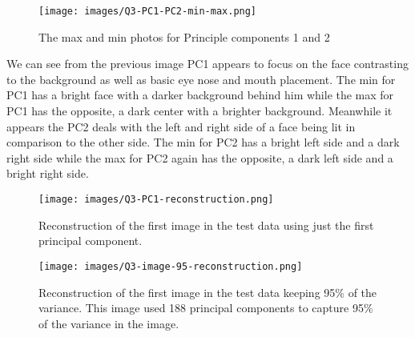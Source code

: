 \documentclass[12pt]{article}
\begin{document}
\begin{figure}[h!]
    \centering
    \texttt{[image: images/Q3-PC1-PC2-min-max.png]}
    \caption{The max and min photos for Principle components 1 and 2}
\end{figure}
We can see from the previous image PC1 appears to focus on the face contrasting to the background as well as basic eye nose and mouth placement.
The min for PC1 has a bright face with a darker background behind him while the max for PC1 has the opposite, a dark center with a brighter background.
\newline
Meanwhile it appears the PC2 deals with the left and right side of a face being lit in comparison to the other side.
The min for PC2 has a bright left side and a dark right side while the max for PC2 again has the opposite, a dark left side and a bright right side.

\begin{figure}[h!]
    \centering
    \texttt{[image: images/Q3-PC1-reconstruction.png]}
    \caption{Reconstruction of the first image in the test data using just the first principal component.}
\end{figure}

\begin{figure}[h!]
    \centering
    \texttt{[image: images/Q3-image-95-reconstruction.png]}
    \caption{Reconstruction of the first image in the test data keeping 95\% of the variance. \newline
             This image used 188 principal components to capture 95\% of the variance in the image.}
\end{figure}
\end{document}
